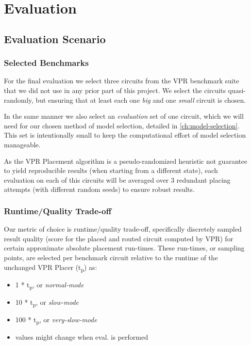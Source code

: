 
\chapter{Evaluation}\label{ch:evaluation}
\glsresetall %

\section{Evaluation Scenario}

\subsection{Selected Benchmarks}\label{ch:benchmarks}

For the final evaluation we select three circuits from the \gls{VPR} benchmark suite that we did not use in any prior part of this project. We select the circuits quasi-randomly, but ensuring that at least each one \textit{big} and one \textit{small} circuit is chosen.

In the same manner we also select an \textit{evaluation} set of one circuit, which we will need for our chosen method of model selection, detailed in \ref{ch:model-selection}. This set is intentionally small to keep the computational effort of model selection manageable.

As the \gls{VPR} Placement algorithm is a pseudo-randomized heuristic not guarantee to yield reproducible results (when starting from a different state), each evaluation on each of this circuits will be averaged over 3\cite{TODO} redundant placing attempts (with different random seeds) to ensure robust results.

\subsection{Runtime/Quality Trade-off}

Our metric of choice is runtime/quality trade-off, specifically discretely sampled result quality (score for the placed and routed circuit computed by \gls{VPR}) for certain approximate absolute placement run-times. These run-times, or sampling points, are selected per benchmark circuit relative to the runtime of the unchanged \gls{VPR} Placer (t\textsubscript{p}) as:

\begin{itemize}
	\item 1   * t\textsubscript{p}, or \textit{normal-mode}
	\item 10  * t\textsubscript{p}, or \textit{slow-mode}
	\item 100  * t\textsubscript{p}, or \textit{very-slow-mode}
	\item \cite{TODO} values might change when eval. is performed
\end{itemize}

